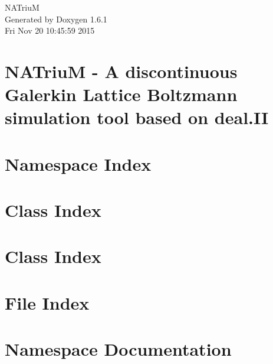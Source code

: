 \documentclass[a4paper]{book}
\begin{document}
\hypersetup{pageanchor=false}
\begin{titlepage}
\vspace*{7cm}
\begin{center}
{\Large NATriuM }\\
\vspace*{1cm}
{\large Generated by Doxygen 1.6.1}\\
\vspace*{0.5cm}
{\small Fri Nov 20 10:45:59 2015}\\
\end{center}
\end{titlepage}
\clearemptydoublepage
{}
\tableofcontents
\clearemptydoublepage
{}
\hypersetup{pageanchor=true}
\chapter{NATriuM -\/ A discontinuous Galerkin Lattice Boltzmann simulation tool based on deal.II}
\label{index}\hypertarget{index}{}
\chapter{Namespace Index}

\chapter{Class Index}

\chapter{Class Index}

\chapter{File Index}

\chapter{Namespace Documentation}



\end{document}
